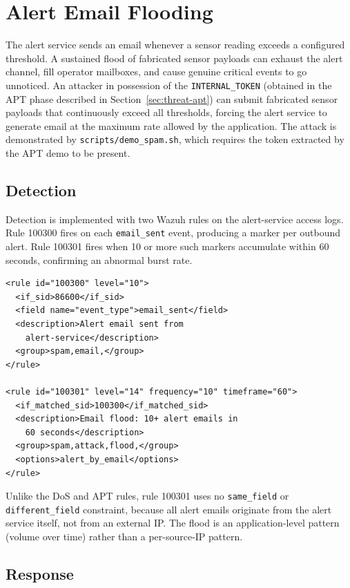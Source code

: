 \section{Alert Email Flooding}
\label{sec:threat-spam}

The alert service sends an email whenever a sensor reading exceeds a configured
threshold. A sustained flood of fabricated sensor payloads can exhaust the alert
channel, fill operator mailboxes, and cause genuine critical events to go unnoticed.
An attacker in possession of the
\texttt{INTERNAL\_TOKEN} (obtained in the APT phase described in
Section~\ref{sec:threat-apt}) can submit fabricated sensor payloads that
continuously exceed all thresholds, forcing the alert service to generate email
at the maximum rate allowed by the application. The attack is demonstrated by
\texttt{scripts/demo\_spam.sh}, which requires the token extracted by the
APT demo to be present.

\subsection{Detection}

Detection is implemented with two Wazuh rules on the alert-service access logs.
Rule 100300 fires on each \texttt{email\_sent} event, producing a marker per
outbound alert. Rule 100301 fires when 10 or more such markers accumulate within
60 seconds, confirming an abnormal burst rate.

\begin{lstlisting}[style=xmlstyle, caption={Wazuh rules for alert email flood detection.}]
<rule id="100300" level="10">
  <if_sid>86600</if_sid>
  <field name="event_type">email_sent</field>
  <description>Alert email sent from
    alert-service</description>
  <group>spam,email,</group>
</rule>

<rule id="100301" level="14" frequency="10" timeframe="60">
  <if_matched_sid>100300</if_matched_sid>
  <description>Email flood: 10+ alert emails in
    60 seconds</description>
  <group>spam,attack,flood,</group>
  <options>alert_by_email</options>
</rule>
\end{lstlisting}

Unlike the DoS and APT rules, rule 100301 uses no \texttt{same\_field} or
\texttt{different\_field} constraint, because all alert emails originate from
the alert service itself, not from an external IP. The flood is an application-level
pattern (volume over time) rather than a per-source-IP pattern.

\subsection{Response}

